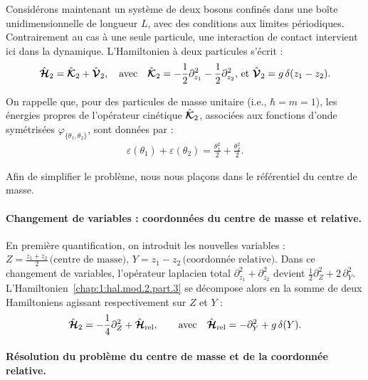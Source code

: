 Considérons maintenant un système de deux bosons confinés dans une boîte unidimensionnelle de longueur \(L\), avec des conditions aux limites périodiques. Contrairement au cas à une seule particule, une interaction de contact intervient ici dans la dynamique. L’Hamiltonien à deux particules s’écrit :
\begin{eqnarray}
	\hat{\bm{\mathcal{H}}}_2 = \hat{\bm{\mathcal{K}}}_2 + \hat{\bm{\mathcal{V}}}_2, \quad \text{avec} \quad \hat{\bm{\mathcal{K}}}_2 = - \frac{1}{2} \partial_{z_1}^2 - \frac{1}{2} \partial_{z_2}^2, \, \text{et} \,\, \hat{\bm{\mathcal{V}}}_2 = g \, \delta(z_1 - z_2). \label{chap:1:hal.mod.2.part.3}
\end{eqnarray}

On rappelle que, pour des particules de masse unitaire (i.e., \(\hbar = m = 1\)), les énergies propres de l’opérateur cinétique \(\hat{\bm{\mathcal{K}}}_2\), associées aux fonctions d’onde symétrisées \(\varphi_{\{ \theta_1 , \theta_2 \}}\), sont données par :
\begin{eqnarray}
	\varepsilon(\theta_1) + \varepsilon(\theta_2) = \frac{\theta_1^2}{2} + \frac{\theta_2^2}{2}.
\end{eqnarray}

Afin de simplifier le problème, nous nous plaçons dans le référentiel du centre de masse.

\paragraph{Changement de variables : coordonnées du centre de masse et relative.}

En première quantification, on introduit les nouvelles variables :
\(
Z = \frac{z_1 + z_2}{2} \, \text{(centre de masse)}, \, Y = z_1 - z_2 \, \text{(coordonnée relative)}.
\)
Dans ce changement de variables, l’opérateur laplacien total 
\(
\partial_{z_1}^2 + \partial_{z_2}^2 
\)
devient
\(
\frac{1}{2} \partial_Z^2 + 2 \, \partial_Y^2.
\)
L’Hamiltonien~\eqref{chap:1:hal.mod.2.part.3} se décompose alors en la somme de deux Hamiltoniens agissant respectivement sur \(Z\) et \(Y\) :
\begin{eqnarray}\label{chap:1:hal.mod.2.part.4}
	\hat{\bm{\mathcal{H}}}_2 = -\frac{1}{4} \partial_Z^2 + \hat{\bm{\mathcal{H}}}_{\text{rel}}, \qquad \text{avec} \quad \hat{\bm{\mathcal{H}}}_{\text{rel}} = - \partial_Y^2 + g \, \delta(Y).
\end{eqnarray}

\paragraph{Résolution du problème du centre de masse et de la coordonnée relative.}

